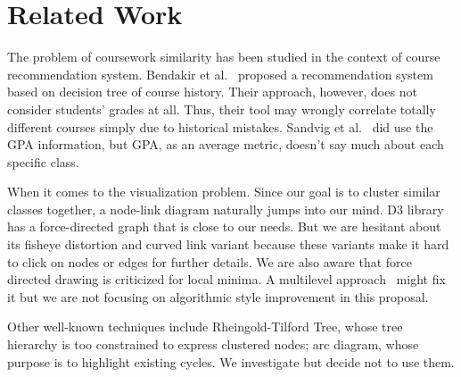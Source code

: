 \section{Related Work}
\label{sec:related}

The problem of coursework similarity has been studied in the context of course recommendation system. Bendakir et al.~\cite{bendakir2006using} proposed a recommendation system based on decision tree of course history. Their approach, however, does not consider students' grades at all. Thus, their tool may wrongly correlate totally different courses simply due to historical mistakes. Sandvig et al.~\cite{sandvig2005aacorn} did use the GPA information, but GPA, as an average metric, doesn't say much about each specific class. 

When it comes to the visualization problem. Since our goal is to cluster similar classes together, a node-link diagram naturally jumps into our mind. D3 library has a force-directed graph that is close to our needs. But we are hesitant about its fisheye distortion and curved link variant because these variants make it hard to click on nodes or edges for further details. We are also aware that force directed drawing is criticized for local minima. A multilevel approach~\cite{walshaw2000multilevel} might fix it but we are not focusing on algorithmic style improvement in this proposal.

Other well-known techniques include Rheingold-Tilford Tree, whose tree hierarchy is too constrained to express clustered nodes; arc diagram, whose purpose is to highlight existing cycles. We investigate but decide not to use them. 
